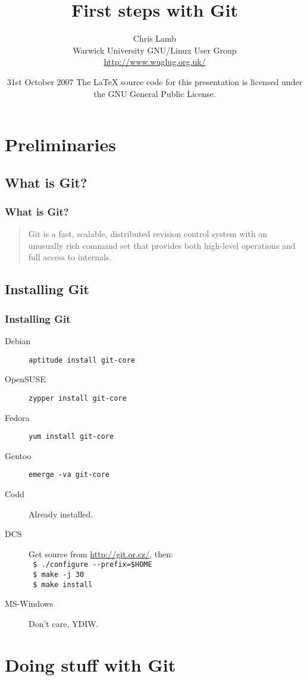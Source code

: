 \documentclass{beamer}
\title{First steps with Git}
\author[Chris Lamb, WUGLUG]{Chris Lamb\\Warwick University GNU/Linux User Group\\\small{\url{http://www.wuglug.org.uk/}}} %
\date{31st October 2007
\newline
\newline
\tiny{The \LaTeX{} source code for this presentation is licensed under the GNU General Public License.}}
\begin{document}
\frame{\titlepage}

\section{Preliminaries}

\subsection{What is Git?}
\frame
{
    \frametitle{What is Git?}

    \begin{quote}
        Git is a fast, scalable, distributed revision control system with an
        unusually rich command set that provides both high-level operations and
        full access to internals.
    \end{quote}
}

\subsection{Installing Git}
\begin{frame}[fragile]
    \frametitle{Installing Git}

    \begin{description}
        \item[Debian] \verb/aptitude install git-core/
        \item[OpenSUSE] \verb/zypper install git-core/
        \item[Fedora] \verb/yum install git-core/
        \item[Gentoo] \verb/emerge -va git-core/
        \item[Codd] Already installed.
        \item[DCS] Get source from \url{http://git.or.cz/}, then: \\ 
            \verb# $ ./configure --prefix=$HOME# \\
            \verb# $ make -j 30# \\
            \verb# $ make install#
        \item[MS-Windows] Don't care, YDIW.
    \end{description}
\end{frame}


\section{Doing stuff with Git}
\end{document}
